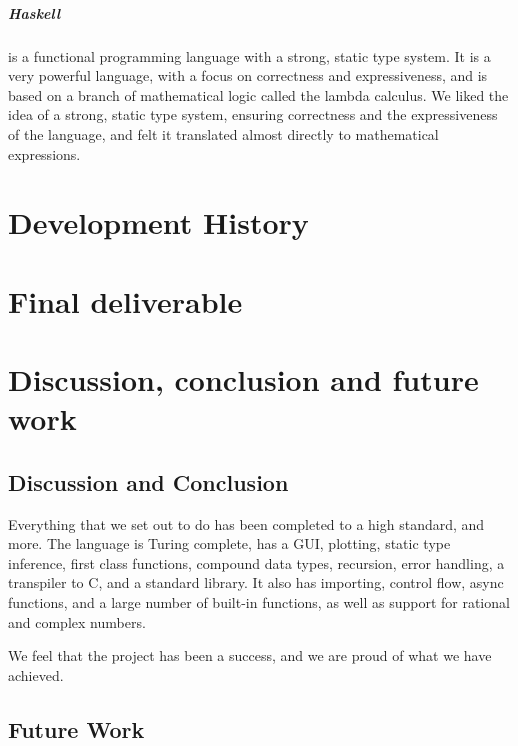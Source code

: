 \documentclass[a4paper, oneside, 11pt]{report}
\begin{document}
\paragraph{Haskell} is a functional programming language with a strong, static type system.
It is a very powerful language, with a focus on correctness and expressiveness, and is based on a branch of mathematical
logic called the lambda calculus.
We liked the idea of a strong, static type system, ensuring correctness and the expressiveness of the language, and 
felt it translated almost directly to mathematical expressions.

\chapter{Development History}\label{ch:devhist}



\chapter{Final deliverable}\label{ch:impl}



\chapter{Discussion, conclusion and future work}\label{ch:discussion-conclusion-and-future-work}

\section{Discussion and Conclusion}\label{sec:discussion}

Everything that we set out to do has been completed to a high standard, and more.
The language is Turing complete, has a GUI, plotting, static type inference, first class functions, compound data types,
recursion, error handling, a transpiler to C, and a standard library.
It also has importing, control flow, async functions, and a large number of built-in functions, as well as support 
for rational and complex numbers.

We feel that the project has been a success, and we are proud of what we have achieved.

\section{Future Work}\label{sec:future-work}
\end{document}
